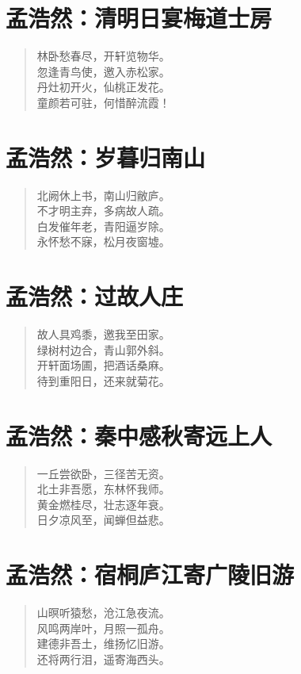 \documentclass[12pt,oneside]{book}
\newenvironment{shici}{%
\begin{verse}\centering\yanti\large\hspace{12pt}}{\end{verse}}
\begin{document}
\begin{common-format}
\chapter{孟浩然：清明日宴梅道士房}
\begin{shici}
林卧愁春尽，开轩览物华。\\
忽逢青鸟使，邀入赤松家。\\
丹灶初开火，仙桃正发花。\\
童颜若可驻，何惜醉流霞！
\end{shici}

\chapter{孟浩然：岁暮归南山}
\begin{shici}
北阙休上书，南山归敝庐。\\
不才明主弃，多病故人疏。\\
白发催年老，青阳逼岁除。\\
永怀愁不寐，松月夜窗墟。
\end{shici}

\chapter{孟浩然：过故人庄}
\begin{shici}
故人具鸡黍，邀我至田家。\\
绿树村边合，青山郭外斜。\\
开轩面场圃，把酒话桑麻。\\
待到重阳日，还来就菊花。
\end{shici}

\chapter{孟浩然：秦中感秋寄远上人}
\begin{shici}
一丘尝欲卧，三径苦无资。\\
北土非吾愿，东林怀我师。\\
黄金燃桂尽，壮志逐年衰。\\
日夕凉风至，闻蝉但益悲。
\end{shici}

\chapter{孟浩然：宿桐庐江寄广陵旧游}
\begin{shici}
山暝听猿愁，沧江急夜流。\\
风鸣两岸叶，月照一孤舟。\\
建德非吾土，维扬忆旧游。\\
还将两行泪，遥寄海西头。
\end{shici}


\end{common-format}
\end{document}
